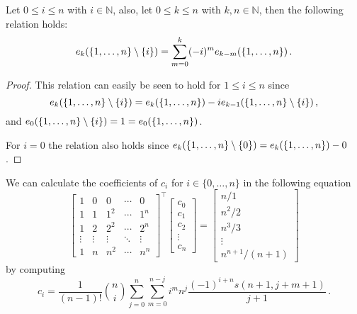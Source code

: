 \begin{lemma}
\label{lemma:missing}
Let $0 \leq i \leq n$ with $i \in \mathbb N$, also, let $0 \leq k \leq n$ with $k,n \in \mathbb N$, then the following relation holds:
\begin{equation}
    e_{k} ( \{ 1, \dots, n \} \mathbin{\backslash} \{ i \}) = \sum_{m=0}^{k} (-i)^m e_{k-m}(\{ 1, \dots, n \}) \,. \nonumber
\end{equation}
\end{lemma}
\begin{proof}
This relation can easily be seen to hold for $1 \leq i \leq n$ since
\begin{equation}
    e_{k} ( \{ 1, \dots, n \} \mathbin{\backslash} \{ i \}) = e_{k} ( \{ 1, \dots, n \}) - i e_{k-1} ( \{ 1, \dots, n \} \mathbin{\backslash} \{ i \}) \,, \nonumber
\end{equation}
and $e_0(\{ 1, \dots, n \} \mathbin{\backslash} \{ i \}) = 1 = e_0(\{ 1, \dots, n \})$.

For $i=0$ the relation also holds since $e_k(\{ 1, \dots, n \} \mathbin{\backslash} \{ 0 \}) = e_k(\{ 1, \dots, n \}) - 0$.
\end{proof}


\begin{theorem}
\label{theorem:calc}
We can calculate the coefficients of $c_i$ for $i \in \{ 0, \dots, n \}$ in the following equation
\begin{equation}
    \begin{bmatrix}
        1&0&0&\cdots&0 \\
        1&1&1^2&\cdots&1^n \\
        1&2&2^2&\cdots&2^n \\
        \vdots&\vdots & \vdots & \ddots & \vdots\\
        1&n&n^2&\cdots&n^n
    \end{bmatrix}^\top
    \begin{bmatrix}
        c_0 \\
        c_1 \\
        c_2 \\
        \vdots \\
        c_n
    \end{bmatrix}
    =
    \begin{bmatrix}
        n/1\\
        n^2/2\\
        n^3/3\\
        \vdots \\
        n^{n+1}/(n+1)
    \end{bmatrix} \label{eq:vander}
\end{equation}
by computing
\begin{equation}
    c_i =
        \frac{1}{(n-1)!} \binom{n}{i} \sum_{j=0}^{n} \sum_{m=0}^{n-j} i^m n^{j} \frac{(-1)^{i+n} s(n+1, j+m+1) }{j+1} \,. \nonumber
\end{equation}
\end{theorem}

